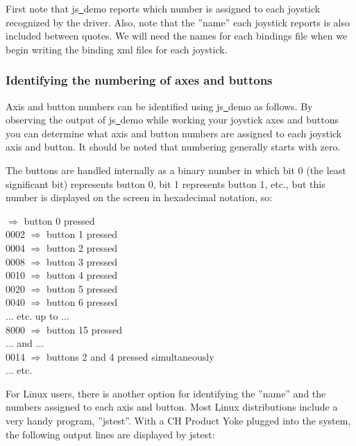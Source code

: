 \noindent
First note that js\underline{~}demo reports which number is assigned to each joystick recognized by the driver.  Also, note that the ''name'' each joystick reports is also included between quotes.  We will need the names for each bindings file when we begin writing the binding xml files for each joystick.

\subsubsection{Identifying the numbering of axes and buttons\label{identifying}}
Axis and button numbers can be identified using js\underline{~}demo as follows. By observing the output of js\underline{~}demo while working your joystick axes and buttons you can determine what axis and button numbers are assigned to each joystick axis and button. It should be noted that numbering generally starts with zero. 

The buttons are handled internally as a binary number in which bit 0 (the least significant bit) represents button 0, bit 1 represents button 1, etc., but this number is displayed on the screen in hexadecimal notation, so:
\medskip

 $\Rightarrow$ button 0 pressed\\
  0002 $\Rightarrow$ button 1 pressed\\
  0004 $\Rightarrow$ button 2 pressed\\
  0008 $\Rightarrow$ button 3 pressed\\
  0010 $\Rightarrow$ button 4 pressed\\
  0020 $\Rightarrow$ button 5 pressed\\
  0040 $\Rightarrow$ button 6 pressed\\
  ... etc. up to ...\\
  8000 $\Rightarrow$ button 15 pressed\\
  ... and ...\\
  0014 $\Rightarrow$ buttons 2 and 4 pressed simultaneously\\
  ... etc.
  \medskip

For Linux users, there is another option for identifying the ''name'' and the numbers assigned to each axis and button.  Most Linux distributions include a very handy program, ''jstest''.  With a CH Product Yoke plugged into the system, the following output lines are displayed by jstest:
\medskip

